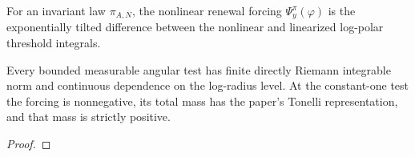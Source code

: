 \begin{definition}
  \label{def:nd-nonlinear-forcing}
  \leanok
  For an invariant law $\pi_{A,N}$, the nonlinear renewal forcing
  $\Psi_y^\pi(\varphi)$ is the exponentially tilted difference between the
  nonlinear and linearized log-polar threshold integrals.
\end{definition}

\begin{proposition}
  \label{prop:nd-forcing-admissibility}
  \leanok
  Every bounded measurable angular test has finite directly Riemann integrable
  norm and continuous dependence on the log-radius level.  At the constant-one
  test the forcing is nonnegative, its total mass has the paper's Tonelli
  representation, and that mass is strictly positive.
\end{proposition}
\begin{proof}\leanok\end{proof}
